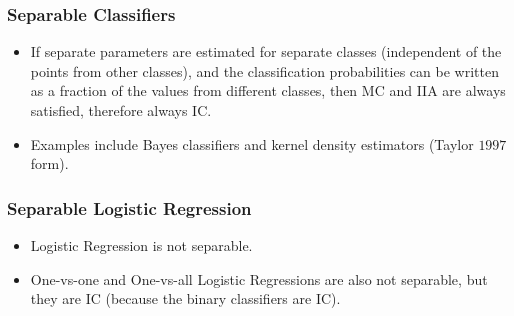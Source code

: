 \documentclass{beamer}
\begin{document}
\begin{frame} \frametitle{Separable Classifiers}
\begin{itemize}
\item If separate parameters are estimated for separate classes (independent of the points from other classes), and the classification probabilities can be written as a fraction of the values from different classes, then MC and IIA are always satisfied, therefore always IC.
\item Examples include Bayes classifiers and kernel density estimators (Taylor $1997$ form).
\end{itemize}
\end{frame}

\begin{frame} \frametitle{Separable Logistic Regression}
\begin{itemize}
\item Logistic Regression is not separable.
\item One-vs-one and One-vs-all Logistic Regressions are also not separable, but they are IC (because the binary classifiers are IC).
\end{itemize}
\end{frame}
\end{document}
